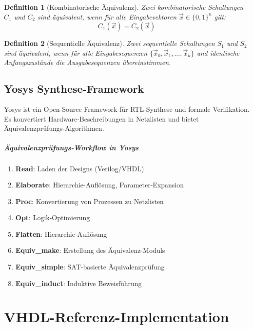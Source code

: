 ﻿\documentclass[12pt,a4paper]{report}
\newtheorem{definition}{Definition}[section]
\begin{document}
\begin{definition}[Kombinatorische Äquivalenz]
Zwei kombinatorische Schaltungen $C_1$ und $C_2$ sind äquivalent, wenn für alle Eingabevektoren $\vec{x} \in \{0,1\}^n$ gilt:
\[
C_1(\vec{x}) = C_2(\vec{x})
\]
\end{definition}

\begin{definition}[Sequentielle Äquivalenz]
Zwei sequentielle Schaltungen $S_1$ und $S_2$ sind äquivalent, wenn für alle Eingabesequenzen $\{\vec{x}_0, \vec{x}_1, \ldots, \vec{x}_k\}$ und identische Anfangszustände die Ausgabesequenzen übereinstimmen.
\end{definition}

\section{Yosys Synthese-Framework}

Yosys ist ein Open-Source Framework für RTL-Synthese und formale Verifikation. Es konvertiert Hardware-Beschreibungen in Netzlisten und bietet Äquivalenzprüfungs-Algorithmen.

\paragraph{Äquivalenzprüfungs-Workflow in Yosys}

\begin{enumerate}
    \item \textbf{Read}: Laden der Designs (Verilog/VHDL)
    \item \textbf{Elaborate}: Hierarchie-Auflösung, Parameter-Expansion
    \item \textbf{Proc}: Konvertierung von Prozessen zu Netzlisten
    \item \textbf{Opt}: Logik-Optimierung
    \item \textbf{Flatten}: Hierarchie-Auflösung
    \item \textbf{Equiv\_make}: Erstellung des Äquivalenz-Moduls
    \item \textbf{Equiv\_simple}: SAT-basierte Äquivalenzprüfung
    \item \textbf{Equiv\_induct}: Induktive Beweisführung
\end{enumerate}

\chapter{VHDL-Referenz-Implementation}
\end{document}
